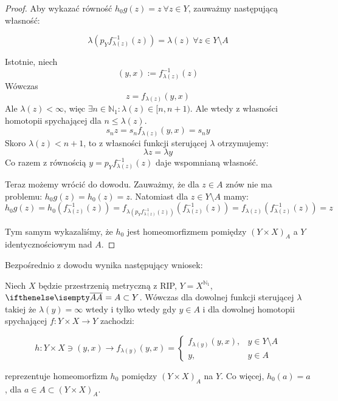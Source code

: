 \begin{thm}
\begin{proof}
    Aby wykazać równość $h_0g(z) = z\ \forall z \in Y$, zauważmy następującą własność:
    
    \[\lambda\left(p_Y f_{\lambda(z)}^{-1}(z)\right) = \lambda(z)\ \forall z \in Y \setminus A\]
    
    Istotnie, niech
    \[(y,x) := f_{\lambda(z)}^{-1}(z)\]
    Wówczas
    \[z = f_{\lambda(z)}(y,x)\]
    Ale $\lambda(z) < \infty$, więc $\exists n \in \mathbb{N}_1: \lambda(z) \in [n, n+1)$. Ale wtedy z własności homotopii spychającej dla $n \leq \lambda(z)$.
    \[s_n z = s_n f_{\lambda(z)}(y,x) = s_n y\]
    Skoro $\lambda(z) < n+1$, to z własności funkcji sterującej $\lambda$ otrzymujemy:
    \[\lambda z = \lambda y\]
    Co razem z równością $y = p_Y f_{\lambda(z)}^{-1}(z)$ daje wspomnianą własność.
    
    Teraz możemy wrócić do dowodu. Zauważmy, że dla $z \in A$ znów nie ma problemu: $h_0g(z) = h_0(z) = z$. Natomiast dla $z \in Y \setminus A$ mamy:
    \[
      h_0g(z) = h_0\left(f_{\lambda(z)}^{-1}(z)\right) = f_{\lambda\left(p_Y f_{\lambda(z)}^{-1}(z)\right)}\left(f_{\lambda(z)}^{-1}(z)\right) = f_{\lambda(z)}\left(f_{\lambda(z)}^{-1}(z)\right) = z
    \]
    
    Tym samym wykazaliśmy, że $h_0$ jest homeomorfizmem pomiędzy $(Y \times X)_A$ a $Y$ identycznościowym nad $A$.
  \end{proof}
\end{thm}


Bezpośrednio z dowodu wynika następujący wniosek:
\begin{cor}
  Niech $X$ będzie przestrzenią metryczną z RIP, $Y = X^{\mathbb{N}_1}$, $\cl{A} = A \subset Y$.
  Wówczas dla dowolnej funkcji sterującej $\lambda$ takiej że $\lambda(y) = \infty$ wtedy i tylko wtedy gdy $y \in A$ i dla dowolnej homotopii spychającej $f: Y \times X \rightarrow Y$ zachodzi:
  
  \[h: Y \times X \ni (y,x) \rightarrow f_{\lambda(y)}(y,x) = 
    \begin{cases}
      f_{\lambda(y)}(y,x),&y \in Y \setminus A \\
      y,&y \in A
    \end{cases}\]
  
  reprezentuje homeomorfizm $h_0$ pomiędzy $(Y \times X)_A$ na $Y$. Co więcej, $h_0(a) = a$, dla $a \in A \subset (Y \times X)_A$.
\end{cor}

